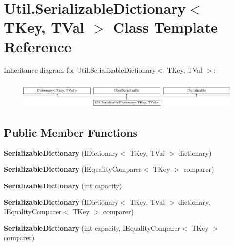 \hypertarget{class_util_1_1_serializable_dictionary}{}\section{Util.\+Serializable\+Dictionary$<$ T\+Key, T\+Val $>$ Class Template Reference}
\label{class_util_1_1_serializable_dictionary}
Inheritance diagram for Util.\+Serializable\+Dictionary$<$ T\+Key, T\+Val $>$\+:\begin{figure}[H]
\begin{center}
\leavevmode
\includegraphics[height=1.475626cm]{class_util_1_1_serializable_dictionary}
\end{center}
\end{figure}
\subsection*{Public Member Functions}
\begin{DoxyCompactItemize}
\item 
{\bfseries Serializable\+Dictionary} (I\+Dictionary$<$ T\+Key, T\+Val $>$ dictionary)\hypertarget{class_util_1_1_serializable_dictionary_a9b3df5a4db46f4bdd84a98bcfd29e7d5}{}\label{class_util_1_1_serializable_dictionary_a9b3df5a4db46f4bdd84a98bcfd29e7d5}

\item 
{\bfseries Serializable\+Dictionary} (I\+Equality\+Comparer$<$ T\+Key $>$ comparer)\hypertarget{class_util_1_1_serializable_dictionary_aebd85fe37168589c3dff359661604e3e}{}\label{class_util_1_1_serializable_dictionary_aebd85fe37168589c3dff359661604e3e}

\item 
{\bfseries Serializable\+Dictionary} (int capacity)\hypertarget{class_util_1_1_serializable_dictionary_a43761f5b4b10f2f19d9a0678fdf942b8}{}\label{class_util_1_1_serializable_dictionary_a43761f5b4b10f2f19d9a0678fdf942b8}

\item 
{\bfseries Serializable\+Dictionary} (I\+Dictionary$<$ T\+Key, T\+Val $>$ dictionary, I\+Equality\+Comparer$<$ T\+Key $>$ comparer)\hypertarget{class_util_1_1_serializable_dictionary_aac656cb4391481872fab36494414beb9}{}\label{class_util_1_1_serializable_dictionary_aac656cb4391481872fab36494414beb9}

\item 
{\bfseries Serializable\+Dictionary} (int capacity, I\+Equality\+Comparer$<$ T\+Key $>$ comparer)\hypertarget{class_util_1_1_serializable_dictionary_a4d263d5213de95a101c07de78fe9cb66}{}\label{class_util_1_1_serializable_dictionary_a4d263d5213de95a101c07de78fe9cb66}

\end{DoxyCompactItemize}
